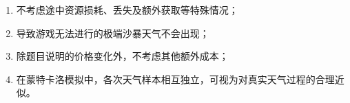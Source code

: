 \begin{enumerate}
    \item 不考虑途中资源损耗、丢失及额外获取等特殊情况；
    \item 导致游戏无法进行的极端沙暴天气不会出现；
    \item 除题目说明的价格变化外，不考虑其他额外成本；
    \item 在蒙特卡洛模拟中，各次天气样本相互独立，可视为对真实天气过程的合理近似。
\end{enumerate}